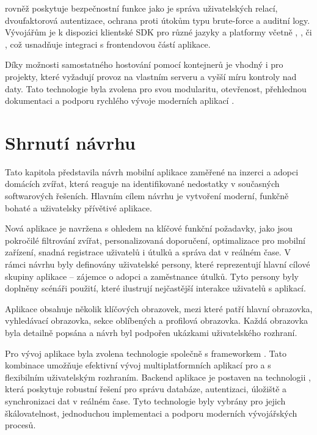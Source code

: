 \documentclass[czech, bp, kiv, he, iso690numb, pdf]{fasthesis}
\begin{document}
     rovněž poskytuje bezpečnostní funkce jako je správa uživatelských relací, dvoufaktorová autentizace, ochrana proti útokům typu brute-force a auditní logy. Vývojářům je k dispozici klientské SDK pro různé jazyky a platformy včetně , ,  či , což usnadňuje integraci s frontendovou částí aplikace.

    Díky možnosti samostatného hostování pomocí  kontejnerů je  vhodný i pro projekty, které vyžadují provoz na vlastním serveru a vyšší míru kontroly nad daty. Tato technologie byla zvolena pro svou modularitu, otevřenost, přehlednou dokumentaci a podporu rychlého vývoje moderních aplikací \cite{appwrite}.




    \section{Shrnutí návrhu}

    Tato kapitola představila návrh mobilní aplikace zaměřené na inzerci a adopci domácích zvířat, která reaguje na identifikované nedostatky v současných softwarových řešeních. Hlavním cílem návrhu je vytvoření moderní, funkčně bohaté a uživatelsky přívětivé aplikace.

    Nová aplikace je navržena s ohledem na klíčové funkční požadavky, jako jsou pokročilé filtrování zvířat, personalizovaná doporučení, optimalizace pro mobilní zařízení, snadná registrace uživatelů i útulků a správa dat v reálném čase. V rámci návrhu byly definovány uživatelské persony, které reprezentují hlavní cílové skupiny aplikace – zájemce o adopci a zaměstnance útulků. Tyto persony byly doplněny scénáři použití, které ilustrují nejčastější interakce uživatelů s aplikací.

    Aplikace obsahuje několik klíčových obrazovek, mezi které patří hlavní obrazovka, vyhledávací obrazovka, sekce oblíbených a profilová obrazovka. Každá obrazovka byla detailně popsána a návrh byl podpořen ukázkami uživatelského rozhraní.

    Pro vývoj aplikace byla zvolena technologie  společně s frameworkem . Tato kombinace umožňuje efektivní vývoj multiplatformních aplikací pro  a  s flexibilním uživatelským rozhraním. Backend aplikace je postaven na technologii , která poskytuje robustní řešení pro správu databáze, autentizaci, úložiště a synchronizaci dat v reálném čase. Tyto technologie byly vybrány pro jejich škálovatelnost, jednoduchou implementaci a podporu moderních vývojářských procesů.
\end{document}
